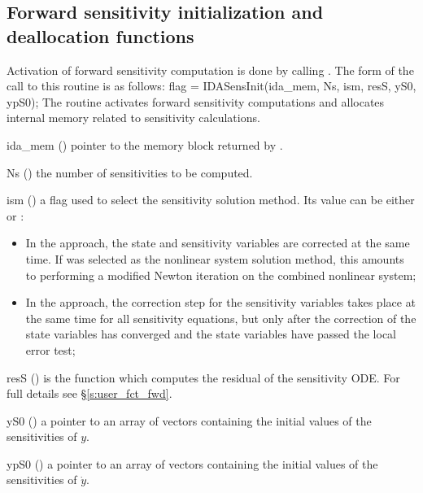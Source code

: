 \subsection{Forward sensitivity initialization and deallocation functions}
\label{ss:sensi_init}
Activation of forward sensitivity computation is done by calling
.
The form of the call to this routine is as follows:
{
  flag = IDASensInit(ida\_mem, Ns, ism, resS, yS0, ypS0);
}
{
  The routine  activates forward sensitivity computations and
  allocates internal memory related to sensitivity calculations.
}
{
  \begin{args}

  \item[ida\_mem] ()
    pointer to the {\idas} memory block returned by .
  \item[Ns] () 
    the number of sensitivities to be computed.
  \item[ism] ()
    a flag used to select the sensitivity solution method.  Its value can 
    be either  or :
    \begin{itemize}
    \item In the  approach, the state and sensitivity variables are
      corrected at the same time. If  was selected as the nonlinear system 
      solution method, this amounts to performing a modified Newton iteration on the
      combined nonlinear system;
    \item In the  approach, the correction step for the sensitivity
      variables takes place at the same time for all sensitivity equations, but only after 
      the correction of the state variables has converged and the state variables 
      have passed the local error test; 
    \end{itemize}
  \item[resS] ()
    is the {\C} function which computes the residual of the sensitivity ODE. 
    For full details see \S\ref{s:user_fct_fwd}.
  \item[yS0] () 
    a pointer to an array of  vectors containing the initial 
    values of the sensitivities of $y$.
  \item[ypS0] () 
    a pointer to an array of  vectors containing the initial 
    values of the sensitivities of $\dot{y}$.
  \end{args}
}
